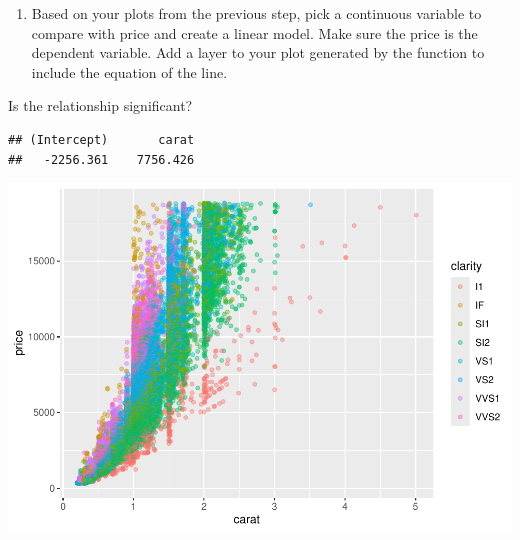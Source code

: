 \documentclass[
]{book}
\newenvironment{Shaded}{\begin{snugshade}}{\end{snugshade}}
\newcommand{\AttributeTok}[1]{\textcolor[rgb]{0.13,0.29,0.53}{#1}}
\newcommand{\DecValTok}[1]{\textcolor[rgb]{0.00,0.00,0.81}{#1}}
\newcommand{\FunctionTok}[1]{\textcolor[rgb]{0.13,0.29,0.53}{\textbf{#1}}}
\newcommand{\NormalTok}[1]{#1}
\newcommand{\OtherTok}[1]{\textcolor[rgb]{0.56,0.35,0.01}{#1}}
\newcommand{\SpecialCharTok}[1]{\textcolor[rgb]{0.81,0.36,0.00}{\textbf{#1}}}
\newcommand{\StringTok}[1]{\textcolor[rgb]{0.31,0.60,0.02}{#1}}
\providecommand{\tightlist}{%
  \setlength{\itemsep}{0pt}\setlength{\parskip}{0pt}}
\begin{document}
\begin{enumerate}
\def\labelenumi{\arabic{enumi}.}
\setcounter{enumi}{4}
\tightlist
\item
  Based on your plots from the previous step, pick a continuous variable to compare with price and create a linear model. Make sure the price is the dependent variable. Add a layer to your plot generated by the function to include the equation of the line.
\end{enumerate}

Is the relationship significant?

\begin{Shaded}
\end{Shaded}

\begin{verbatim}
## (Intercept)       carat 
##   -2256.361    7756.426
\end{verbatim}

\begin{Shaded}
\end{Shaded}

\includegraphics{_main_files/figure-latex/unnamed-chunk-110-1.pdf}
\end{document}
